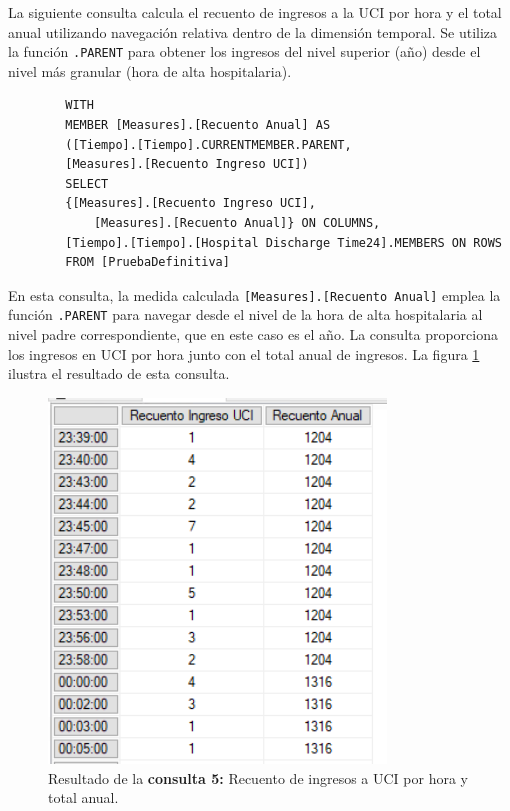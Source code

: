 \documentclass[12pt, a4paper, twoside]{article}
\begin{document}
	La siguiente consulta calcula el recuento de ingresos a la UCI por hora y el total anual utilizando navegación relativa dentro de la dimensión temporal. Se utiliza la función \texttt{.PARENT} para obtener los ingresos del nivel superior (año) desde el nivel más granular (hora de alta hospitalaria).
	
	\begin{verbatim}
		WITH 
		MEMBER [Measures].[Recuento Anual] AS
		([Tiempo].[Tiempo].CURRENTMEMBER.PARENT, 
		[Measures].[Recuento Ingreso UCI])
		SELECT 
		{[Measures].[Recuento Ingreso UCI], 
			[Measures].[Recuento Anual]} ON COLUMNS,
		[Tiempo].[Tiempo].[Hospital Discharge Time24].MEMBERS ON ROWS
		FROM [PruebaDefinitiva]
	\end{verbatim}
	
	En esta consulta, la medida calculada \texttt{[Measures].[Recuento Anual]} emplea la función \texttt{.PARENT} para navegar desde el nivel de la hora de alta hospitalaria al nivel padre correspondiente, que en este caso es el año. La consulta proporciona los ingresos en UCI por hora junto con el total anual de ingresos. La figura \ref{fig:consulta5} ilustra el resultado de esta consulta.
	
	\begin{figure}[H]
		\centering
		\includegraphics[width=0.8\textwidth]{image/consulta5.png}
		\caption{Resultado de la \textbf{consulta 5:} Recuento de ingresos a UCI por hora y total anual.}
		\label{fig:consulta5}
	\end{figure}
	
\end{document}
